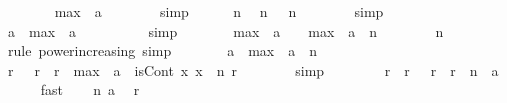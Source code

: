 \begin{isabellebody}
\ \ \ \ \isamarkupfalse%
\ {\isachardoublequoteopen}{}\ {\isasymle}\ max\ {}\ a{\isachardoublequoteclose}\isanewline
\ \ \ \ \ \ \isamarkupfalse%
\ simp\isanewline
\ \ \ \ \isamarkupfalse%
\ n\ \isamarkupfalse%
\ n{}{\isacharcolon}{\kern0pt}\ {\isachardoublequoteopen}{}\ {\isasymle}\ n{\isachardoublequoteclose}\isanewline
\ \ \ \ \ \ \isamarkupfalse%
\ simp\isanewline
\ \ \ \ \isamarkupfalse%
\ {\isachardoublequoteopen}a\ {\isasymle}\ max\ {}\ a\ {\isacharcircum}{\kern0pt}\ {}{\isachardoublequoteclose}\isanewline
\ \ \ \ \ \ \isamarkupfalse%
\ simp\isanewline
\ \ \ \ \isamarkupfalse%
\ \isamarkupfalse%
\ {\isachardoublequoteopen}max\ {}\ a\ {\isacharcircum}{\kern0pt}\ {}\ {\isasymle}\ max\ {}\ a\ {\isacharcircum}{\kern0pt}\ n{\isachardoublequoteclose}\isanewline
\ \ \ \ \ \ \isamarkupfalse%
\ n{}\ \isamarkupfalse%
\ {\isacharparenleft}{\kern0pt}rule\ power{\isacharunderscore}{\kern0pt}increasing{\isacharparenright}{\kern0pt}\ simp\isanewline
\ \ \ \ \isamarkupfalse%
\ \isamarkupfalse%
\ {\isachardoublequoteopen}a\ {\isasymle}\ max\ {}\ a\ {\isacharcircum}{\kern0pt}\ n{\isachardoublequoteclose}\ \isacommand{{\isachardot}{\kern0pt}}\isamarkupfalse%
\isanewline
\ \ \ \ \isamarkupfalse%
\ {\isachardoublequoteopen}{\isasymforall}r{\isachardot}{\kern0pt}\ {}\ {\isasymle}\ r\ {\isasymand}\ r\ {\isasymle}\ max\ {}\ a\ {\isasymlongrightarrow}\ isCont\ {\isacharparenleft}{\kern0pt}{\isasymlambda}x{\isachardot}{\kern0pt}\ x\ {\isacharcircum}{\kern0pt}\ n{\isacharparenright}{\kern0pt}\ r{\isachardoublequoteclose}\isanewline
\ \ \ \ \ \ \isamarkupfalse%
\ simp\isanewline
\ \ \isamarkupfalse%
\isanewline
\ \ \isamarkupfalse%
\ \isamarkupfalse%
\ r\ \ r{\isacharcolon}{\kern0pt}\ {\isachardoublequoteopen}{}\ {\isasymle}\ r\ {\isasymand}\ r\ {\isacharcircum}{\kern0pt}\ n\ {\isacharequal}{\kern0pt}\ a{\isachardoublequoteclose}\isanewline
\ \ \ \ \isamarkupfalse%
\ fast\isanewline
\ \ \isamarkupfalse%
\ n\ a\ \isamarkupfalse%
\ {\isachardoublequoteopen}r\ {\isasymnoteq}\ {}{\isachardoublequoteclose}\isanewline
\ \ \ \ \isamarkupfalse%

\end{isabellebody}
